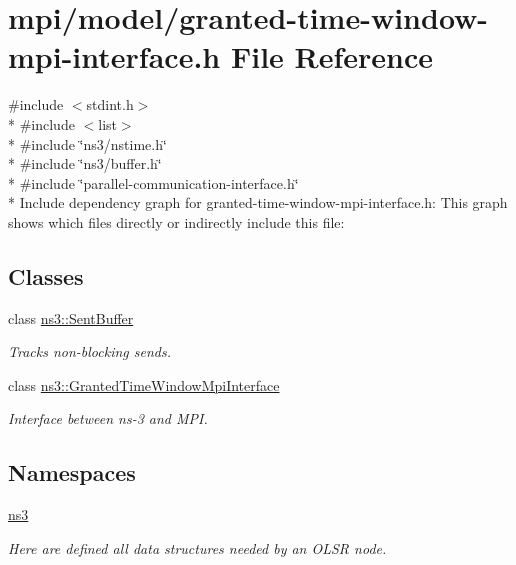 \hypertarget{granted-time-window-mpi-interface_8h}{}\section{mpi/model/granted-\/time-\/window-\/mpi-\/interface.h File Reference}
\label{granted-time-window-mpi-interface_8h}
{\ttfamily \#include $<$stdint.\+h$>$}\\*
{\ttfamily \#include $<$list$>$}\\*
{\ttfamily \#include \char`\"{}ns3/nstime.\+h\char`\"{}}\\*
{\ttfamily \#include \char`\"{}ns3/buffer.\+h\char`\"{}}\\*
{\ttfamily \#include \char`\"{}parallel-\/communication-\/interface.\+h\char`\"{}}\\*
Include dependency graph for granted-\/time-\/window-\/mpi-\/interface.h\+:
This graph shows which files directly or indirectly include this file\+:
\subsection*{Classes}
\begin{DoxyCompactItemize}
\item 
class \hyperlink{classns3_1_1SentBuffer}{ns3\+::\+Sent\+Buffer}
\begin{DoxyCompactList}\small\item\em Tracks non-\/blocking sends. \end{DoxyCompactList}\item 
class \hyperlink{classns3_1_1GrantedTimeWindowMpiInterface}{ns3\+::\+Granted\+Time\+Window\+Mpi\+Interface}
\begin{DoxyCompactList}\small\item\em Interface between ns-\/3 and M\+PI. \end{DoxyCompactList}\end{DoxyCompactItemize}
\subsection*{Namespaces}
\begin{DoxyCompactItemize}
\item 
 \hyperlink{namespacens3}{ns3}
\begin{DoxyCompactList}\small\item\em Here are defined all data structures needed by an O\+L\+SR node. \end{DoxyCompactList}\end{DoxyCompactItemize}
